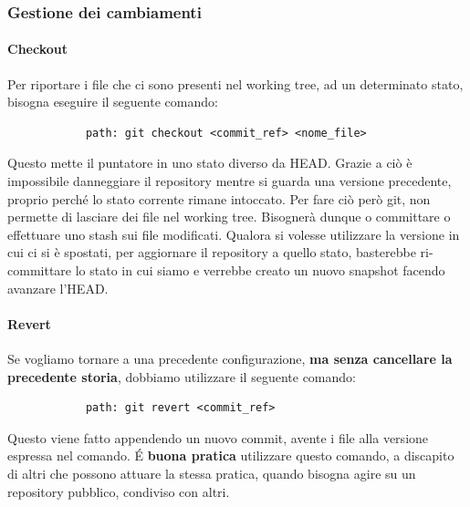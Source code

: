 


		\subsubsection{Gestione dei cambiamenti} %
		\label{ssub:gestione_dei_cambiamenti}
		
			\paragraph{Checkout} %
			\label{par:checkout}
			Per riportare i file che ci sono presenti nel working tree, ad un determinato stato, bisogna eseguire il seguente comando:
			\begin{verbatim}
			path: git checkout <commit_ref> <nome_file>
			\end{verbatim}
			Questo mette il puntatore in uno stato diverso da HEAD. Grazie a ciò è impossibile danneggiare il repository mentre si guarda una versione precedente, proprio perché lo stato corrente rimane intoccato. Per fare ciò però git, non permette di lasciare dei file nel working tree. Bisognerà dunque o committare o effettuare uno stash sui file modificati. \newline
			Qualora si volesse utilizzare la versione in cui ci si è spostati, per aggiornare il repository a quello stato, basterebbe ri-committare lo stato in cui siamo e verrebbe creato un nuovo snapshot facendo avanzare l'HEAD.

			\paragraph{Revert} %
			\label{par:revert}
			Se vogliamo tornare a una precedente configurazione, \textbf{ma senza cancellare la precedente storia}, dobbiamo utilizzare il seguente comando:
			\begin{verbatim}
			path: git revert <commit_ref>
			\end{verbatim}
			Questo viene fatto appendendo un nuovo commit, avente i file alla versione espressa nel comando. \newline
			\'E \textbf{buona pratica} utilizzare questo comando, a discapito di altri che possono attuare la stessa pratica, quando bisogna agire su un repository pubblico, condiviso con altri.
		
